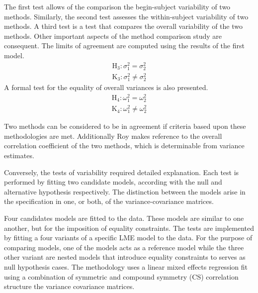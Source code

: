 \documentclass[12pt, a4paper]{report}
\theoremstyle{plain}
\theoremstyle{definition}
\theoremstyle{remark}
\begin{document}
The first test allows of the comparison the begin-subject variability of two methods. Similarly, the second test assesses the within-subject variability of two methods. A third test is a test that compares the overall variability of the two methods. Other important aspects of the method comparison study are consequent. The limits of agreement are computed using the results of the first model.
	\begin{eqnarray*}
		\operatorname{H_3} : \sigma^2_1 = \sigma^2_2 \\
		\operatorname{K_3} : \sigma^2_1 \neq \sigma^2_2
	\end{eqnarray*}
	A formal test for the equality of overall variances is also presented.
	\begin{eqnarray*}
		\operatorname{H_4} : \omega^2_1 = \omega^2_2 \\
		\operatorname{K_4} : \omega^2_1 \neq \omega^2_2
	\end{eqnarray*}

	Two methods can be considered to be in agreement if criteria based upon these methodologies are met. Additionally Roy makes reference to the overall correlation coefficient of the two methods, which is determinable from variance estimates.
	
	Conversely, the tests of variability required detailed explanation. Each test is performed by fitting two candidate models, according with the null and alternative hypothesis respectively. The distinction between the models arise in the specification in one, or both, of the variance-covariance matrices. %
		
Four candidates models are fitted to the data. These models are similar to one another, but for the imposition of equality constraints. The tests are implemented by fitting a four variants of a specific LME model to the data. For the purpose of comparing models, one of the models acts as a reference model while the three other variant are nested models that introduce equality constraints to serves as null hypothesis cases. The methodology uses a linear mixed effects regression fit using a combination of symmetric and compound symmetry (CS) correlation structure the variance covariance matrices.
		
\end{document}

